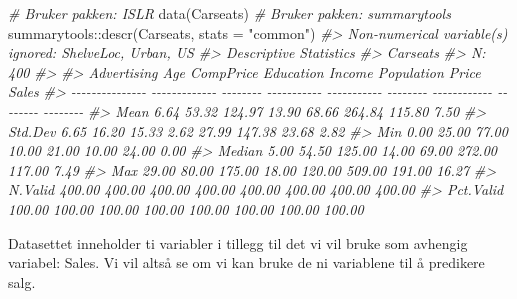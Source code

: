 \documentclass[
]{article}
\newenvironment{Shaded}{\begin{snugshade}}{\end{snugshade}}
\newcommand{\AttributeTok}[1]{\textcolor[rgb]{0.77,0.63,0.00}{#1}}
\newcommand{\CommentTok}[1]{\textcolor[rgb]{0.56,0.35,0.01}{\textit{#1}}}
\newcommand{\FunctionTok}[1]{\textcolor[rgb]{0.00,0.00,0.00}{#1}}
\newcommand{\NormalTok}[1]{#1}
\newcommand{\SpecialCharTok}[1]{\textcolor[rgb]{0.00,0.00,0.00}{#1}}
\newcommand{\StringTok}[1]{\textcolor[rgb]{0.31,0.60,0.02}{#1}}
\begin{document}
\begin{Shaded}
\begin{Highlighting}[]
\CommentTok{\# Bruker pakken: ISLR}
\FunctionTok{data}\NormalTok{(Carseats)}
\CommentTok{\# Bruker pakken: summarytools}
\NormalTok{summarytools}\SpecialCharTok{::}\FunctionTok{descr}\NormalTok{(Carseats, }\AttributeTok{stats =} \StringTok{"common"}\NormalTok{)}
\CommentTok{\#\textgreater{} Non{-}numerical variable(s) ignored: ShelveLoc, Urban, US}
\CommentTok{\#\textgreater{} Descriptive Statistics  }
\CommentTok{\#\textgreater{} Carseats  }
\CommentTok{\#\textgreater{} N: 400  }
\CommentTok{\#\textgreater{} }
\CommentTok{\#\textgreater{}                   Advertising      Age   CompPrice   Education   Income   Population    Price    Sales}
\CommentTok{\#\textgreater{} {-}{-}{-}{-}{-}{-}{-}{-}{-}{-}{-}{-}{-}{-}{-} {-}{-}{-}{-}{-}{-}{-}{-}{-}{-}{-}{-}{-} {-}{-}{-}{-}{-}{-}{-}{-} {-}{-}{-}{-}{-}{-}{-}{-}{-}{-}{-} {-}{-}{-}{-}{-}{-}{-}{-}{-}{-}{-} {-}{-}{-}{-}{-}{-}{-}{-} {-}{-}{-}{-}{-}{-}{-}{-}{-}{-}{-}{-} {-}{-}{-}{-}{-}{-}{-}{-} {-}{-}{-}{-}{-}{-}{-}{-}}
\CommentTok{\#\textgreater{}            Mean          6.64    53.32      124.97       13.90    68.66       264.84   115.80     7.50}
\CommentTok{\#\textgreater{}         Std.Dev          6.65    16.20       15.33        2.62    27.99       147.38    23.68     2.82}
\CommentTok{\#\textgreater{}             Min          0.00    25.00       77.00       10.00    21.00        10.00    24.00     0.00}
\CommentTok{\#\textgreater{}          Median          5.00    54.50      125.00       14.00    69.00       272.00   117.00     7.49}
\CommentTok{\#\textgreater{}             Max         29.00    80.00      175.00       18.00   120.00       509.00   191.00    16.27}
\CommentTok{\#\textgreater{}         N.Valid        400.00   400.00      400.00      400.00   400.00       400.00   400.00   400.00}
\CommentTok{\#\textgreater{}       Pct.Valid        100.00   100.00      100.00      100.00   100.00       100.00   100.00   100.00}
\end{Highlighting}
\end{Shaded}

Datasettet inneholder ti variabler i tillegg til det vi vil bruke som avhengig variabel: Sales. Vi vil altså se om vi kan bruke de ni variablene til å predikere salg.
\end{document}
